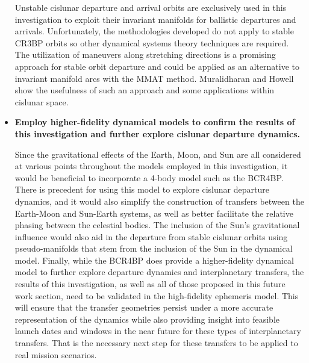\begin{itemize}
            Unstable cislunar departure and arrival orbits are exclusively used in this
            investigation to exploit their invariant manifolds for ballistic departures and
            arrivals. Unfortunately, the methodologies developed do not apply to stable CR3BP
            orbits so other dynamical systems theory techniques are required. The utilization of
            maneuvers along stretching directions is a promising approach for stable orbit
            departure and could be applied as an alternative to invariant manifold arcs with the
            MMAT method. Muralidharan and Howell show the usefulness of such an approach and some
            applications within cislunar space\cite{Muralidharan:2022}.
    \item   \textbf{Employ higher-fidelity dynamical models to confirm the results of this
            investigation and further explore cislunar departure dynamics.}

            Since the gravitational effects of the Earth, Moon, and Sun are all considered at
            various points throughout the models employed in this investigation, it would be
            beneficial to incorporate a 4-body model such as the BCR4BP. There is precedent for
            using this model to explore cislunar departure dynamics, and it would also simplify the
            construction of transfers between the Earth-Moon and Sun-Earth systems, as well as
            better facilitate the relative phasing between the celestial
            bodies\cite{Boudad:2021,Boudad:2022}. The inclusion of the Sun's gravitational
            influence would also aid in the departure from stable cislunar orbits using
            pseudo-manifolds that stem from the inclusion of the Sun in the dynamical model.
            Finally, while the BCR4BP does provide a higher-fidelity dynamical model to further
            explore departure dynamics and interplanetary transfers, the results of this
            investigation, as well as all of those proposed in this future work section, need to be
            validated in the high-fidelity ephemeris model. This will ensure that the transfer
            geometries persist under a more accurate representation of the dynamics while also
            providing insight into feasible launch dates and windows in the near future for these
            types of interplanetary transfers. That is the necessary next step for these transfers
            to be applied to real mission scenarios.
\end{itemize}
